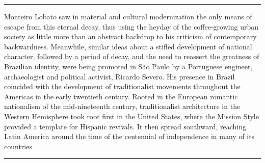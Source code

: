 \begin{center}\rule{0.5\linewidth}{0.5pt}\end{center}

Monteiro Lobato saw in material and cultural modernization the only
means of escape from this eternal decay, thus using the heyday of the
coffee-growing urban society as little more than an abstract backdrop to
his criticism of contemporary backwardness. Meanwhile, similar ideas
about a stifled development of national character, followed by a period
of decay, and the need to reassert the greatness of Brazilian identity,
were being promoted in São Paulo by a Portuguese engineer, archaeologist
and political activist, Ricardo Severo. His presence in Brazil coincided
with the development of traditionalist movements throughout the Americas
in the early twentieth century. Rooted in the European romantic
nationalism of the mid-nineteenth century, traditionalist architecture
in the Western Hemisphere took root first in the United States, where
the Mission Style provided a template for Hispanic revivals. It then
spread southward, reaching Latin America around the time of the
centennial of independence in many of its countries
\autocite[p.~12]{amaral:1994invencion}

\begin{center}\rule{0.5\linewidth}{0.5pt}\end{center}

